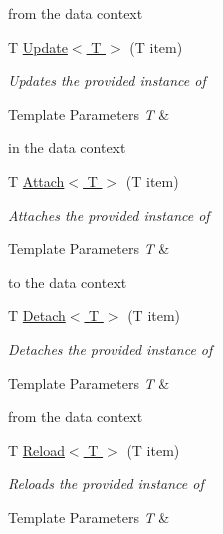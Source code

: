 \begin{DoxyCompactItemize}
\begin{DoxyCompactList}
from the data context \end{DoxyCompactList}\item 
T \hyperlink{class_highway_1_1_data_1_1_entity_framework_1_1_tests_1_1_unit_tests_1_1_commit_events_mock_context_aa642060835ad2e1a58acb568c2a7c879}{Update$<$ T $>$} (T item)
\begin{DoxyCompactList}\small\item\em Updates the provided instance of 
\begin{DoxyTemplParams}{Template Parameters}
{\em T} & \\
\hline
\end{DoxyTemplParams}
in the data context \end{DoxyCompactList}\item 
T \hyperlink{class_highway_1_1_data_1_1_entity_framework_1_1_tests_1_1_unit_tests_1_1_commit_events_mock_context_a3aa68d7d6f1ed4d03deb3ae30a9b3eb9}{Attach$<$ T $>$} (T item)
\begin{DoxyCompactList}\small\item\em Attaches the provided instance of 
\begin{DoxyTemplParams}{Template Parameters}
{\em T} & \\
\hline
\end{DoxyTemplParams}
to the data context \end{DoxyCompactList}\item 
T \hyperlink{class_highway_1_1_data_1_1_entity_framework_1_1_tests_1_1_unit_tests_1_1_commit_events_mock_context_ae6c871e777ac52adb028b0a8bcc58ccd}{Detach$<$ T $>$} (T item)
\begin{DoxyCompactList}\small\item\em Detaches the provided instance of 
\begin{DoxyTemplParams}{Template Parameters}
{\em T} & \\
\hline
\end{DoxyTemplParams}
from the data context \end{DoxyCompactList}\item 
T \hyperlink{class_highway_1_1_data_1_1_entity_framework_1_1_tests_1_1_unit_tests_1_1_commit_events_mock_context_a2a65f95f6650365f1064ac36ae031cc3}{Reload$<$ T $>$} (T item)
\begin{DoxyCompactList}\small\item\em Reloads the provided instance of 
\begin{DoxyTemplParams}{Template Parameters}
{\em T} & \\
\hline
\end{DoxyTemplParams}

\end{DoxyCompactList}
\end{DoxyCompactItemize}
